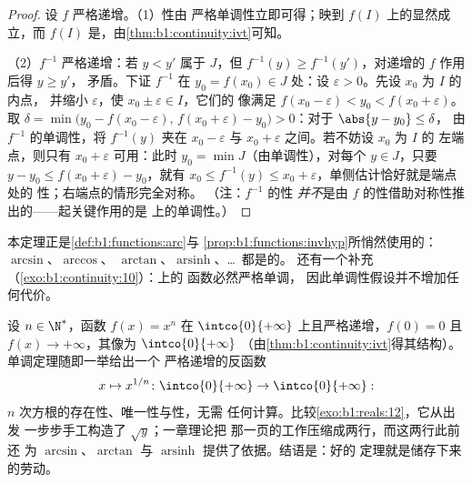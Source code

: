 \begin{proof}
设 $f$ 严格递增。（1）性由
严格单调性立即可得；映到 $f(I)$ 上的显然成立，而 $f(I)$
是，由\cref{thm:b1:continuity:ivt}可知。

（2）$f^{-1}$ 严格递增：若 $y < y'$ 属于 $J$，但 $f^{-1}(y)
\geq f^{-1}(y')$，对递增的 $f$ 作用后得 $y \geq y'$，
矛盾。下证 $f^{-1}$ 在 $y_0 = f(x_0) \in J$ 处：设
$\varepsilon > 0$。先设 $x_0$ 为 $I$ 的内点，
并缩小 $\varepsilon$，使 $x_0 \pm \varepsilon \in I$，它们的
像满足 $f(x_0 - \varepsilon) < y_0 < f(x_0 +
\varepsilon)$。取
$\delta = \min\bigl(y_0 - f(x_0 - \varepsilon),\, f(x_0 +
\varepsilon) - y_0\bigr) > 0$：对于 $\abs{y - y_0} \leq \delta$，
由 $f^{-1}$ 的单调性，将 $f^{-1}(y)$ 夹在 $x_0 -
\varepsilon$ 与 $x_0 + \varepsilon$ 之间。若不妨设 $x_0$ 为 $I$ 的
左端点，则只有 $x_0 + \varepsilon$ 可用：此时
$y_0 = \min J$（由单调性），对每个 $y \in J$，只要 $y - y_0
\leq f(x_0 + \varepsilon) - y_0$，就有 $x_0 \leq f^{-1}(y)
\leq x_0 + \varepsilon$，单侧估计恰好就是端点处的
性；右端点的情形完全对称。
（注：$f^{-1}$ 的性
\emph{并不}是由 $f$ 的性借助对称性推出的——起关键作用的是
上的单调性。）
\end{proof}

\begin{remark}
本定理正是\cref{def:b1:functions:arc}与
\cref{prop:b1:functions:invhyp}所悄然使用的：$\arcsin$、$\arccos$、
$\arctan$、$\operatorname{arsinh}$、\dots\ 都是的。
还有一个补充（\cref{exo:b1:continuity:10}）：上的
\emph{}函数必然严格单调，
因此单调性假设并不增加任何代价。
\end{remark}

\begin{example}[各次方根]\label{ex:b1:continuity:nthroot}
设 $n \in \N^*$，函数 $f(x) = x^n$ 在
$\intco{0}{+\infty}$ 上且严格递增，$f(0) = 0$ 且
$f(x) \to +\infty$，其像为 $\intco{0}{+\infty}$
（由\cref{thm:b1:continuity:ivt}得其结构）。
单调定理随即一举给出一个
严格递增的\emph{}反函数
\[
x \mapsto x^{1/n} \colon \intco{0}{+\infty} \to
\intco{0}{+\infty} :
\]
$n$ 次方根的存在性、唯一性与性，无需
任何计算。比较\cref{exo:b1:reals:12}，它从出发
一步步手工构造了 $\sqrt y$；一章理论把
那一页的工作压缩成两行，而这两行此前还
为 $\arcsin$、$\arctan$ 与
$\operatorname{arsinh}$ 提供了依据。结语是：好的
定理就是储存下来的劳动。
\end{example}

